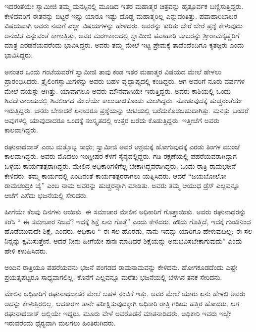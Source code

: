 \vskip 1pt

 ಇದರಂತೆಯೇ ಸ್ವಾಮೀಜಿ ತಮ್ಮ ಮನಸ್ಸಿನಲ್ಲಿ ಮೂಡಿದ ಇತರ ಮಹಾತ್ಮರ ಚಿತ್ರವನ್ನು ಹೃತ್ಪೂರ್ವಕ ಬಣ್ಣಿಸುತ್ತಿದ್ದರು. ಕೇಳಿದವರಿಗೆ ಈತನನ್ನು ಬಿಟ್ಟರೆ ಇನ್ನು ಯಾರೂ ಇಷ್ಟು ದೊಡ್ಡ ಮಹಾತ್ಮರಿಲ್ಲ ಎನ್ನುವಂತಿತ್ತು. ಪವಾಹಾರಿಬಾಬರ ವಿಷಯವಾಗಿ ಅವರು ನಮಗೆ ಎಲ್ಲಾ ವಿಷಯಗಳನ್ನು ಹೇಳಿದರು. ಅವರನ್ನು ಕುರಿತು ಬೇರೆ ಬೇರೆ ಪ್ರಶ್ನೆ \break ಕೇಳುವುದು ಅನುಚಿತ ಎನ್ನುವಂತೆ ಕಾಣುತ್ತಿತ್ತು. ಅವರ ಮರಣಕಾಲದಲ್ಲಿ ಸ್ವಾಮೀಜಿ ಪವಾಹಾರಿ ಬಾಬರನ್ನು ಶ‍್ರೀರಾಮಕೃಷ್ಣರಿಗೆ ಮಾತ್ರ ಎರಡನೆಯವರೆಂದು ಭಾವಿಸಿದ್ದರು. ಅವರು ತಮ್ಮ ಮೇಲೆ ಇಟ್ಟ ಪ್ರೇಮಕ್ಕೆ ತಾವೆಂದೆಂದಿಗೂ ಕೃತಜ್ಞರು ಎಂದು ಭಾವಿಸಿದ್ದರು. 

\vskip 1pt

 ಅನಂತರ ಒಂದು ಗಂಟೆಯವರೆಗೆ ಸ್ವಾಮೀಜಿ ತಾವು ಕಂಡ ಇತರ ಮಹಾತ್ಮರ ವಿಷಯದ ಮೇಲೆ ಹೇಳಲು ಪ್ರಾರಂಭಿಸಿದರು. ತ್ರೈಲಿಂಗಸ್ವಾಮಿಗಳನ್ನು ಅವರು ಬಹಳ ವೃದ್ಧಾಪ್ಯದಲ್ಲಿ ಕಂಡಿದ್ದರು. ಆಗ ಅವರಿಗೆ ನೂರು ವರ್ಷಗಳ ಮೇಲೆ ವಯಸ್ಸು ಆಗಿತ್ತು. ಯಾವಾಗಲೂ ಅವರು ಮೌನವಾಗಿಯೇ ಇರುತ್ತಿದ್ದರು. ಅವರು ಕಾಶಿಯಲ್ಲಿ ಒಂದು ಶಿವದೇವಾಲಯದಲ್ಲಿ ಶಿವಲಿಂಗದ ಮೇಲೆಯೇ ಕಾಲುಚಾಚಿಕೊಂಡು ಮಲಗಿದ್ದರು. ನೋಡುವುದಕ್ಕೆ ಹುಚ್ಚರಂತೆಯೇ ಇರುತ್ತಿದ್ದರು. ಜನರು ಬೇಕಾದರೆ ಏನಾದರೂ ಪ್ರಶ್ನೆಯನ್ನು ಚೀಟಿಯಲ್ಲಿ ಬರೆದುಕೊಡಬಹುದಾಗಿತ್ತು. ಮನಸ್ಸು ಬಂದರೆ ಅವುಗಳಲ್ಲಿ ಯಾವುದಾದರೂ ಒಂದಕ್ಕೆ ಸಂಸ್ಕೃತದಲ್ಲಿ ಉತ್ತರ ಬರೆದು ಕೊಡುತ್ತಿದ್ದರು. ಇತ್ತೀಚೆಗೆ ಅವರು ಕಾಲವಾಗಿದ್ದರು. 

 ರಘುನಾಥದಾಸ್ ಎಂಬ ಮತ್ತೊಬ್ಬ ಸಾಧು; ಸ್ವಾಮೀಜಿ ಅವರ ಆಶ್ರಮಕ್ಕೆ ಹೋಗುವುದಕ್ಕೆ ಎರಡು ತಿಂಗಳ ಮುಂಚೆ ಕಾಲವಾಗಿದ್ದರು. ಅವರು ಮೊದಲು ಇಂಗ್ಲೀಷರ ಕೆಳಗೆ ಸೈನ್ಯದಲ್ಲಿದ್ದರು. ಗಡಿ ರಕ್ಷಣೆಯಲ್ಲಿ ಪಹರೆಯವರಾಗಿದ್ದಾಗ ಒಳ್ಳೆಯ ಕಾರ್ಯತತ್ಪರಾಗಿದ್ದರು. ಮೇಲಿನ ಅಧಿಕಾರಿಗಳಿಗೆಲ್ಲ ಬೇಕಾಗಿದ್ದವರಾಗಿದ್ದರು. ಒಂದು ರಾತ್ರಿ ರಾಮಭಜನೆ ಕೇಳಿದರು. ತಮ್ಮ ಕಾರ್ಯದಲ್ಲಿ ಎಂದಿನಂತೆ ಕಾರ್ಯತತ್ಪರರಾಗಲು ಯತ್ನಿಸಿದರು. ಆದರೆ “ಜಯಬೋಲೋ ರಾಮಚಂದ್ರಕಿ ಜೈ” ಎಂಬ ನಾಮ ಅವರನ್ನು ಹುಚ್ಚರನ್ನಾಗಿ ಮಾಡಿತು. ಅವರು ತಮ್ಮ ಆಯುಧ ಡ್ರೆಸ್ ಎಲ್ಲವನ್ನೂ ಆಚೆಗೆ ಎಸೆದು ಭಜನೆಯಲ್ಲಿ ಸೇರಿದರು. 

 ಹೀಗೆಯೇ ಕೆಲವು ದಿನಗಳು ಆಯಿತು. ಈ ಸಮಾಚಾರ ಮೇಲಿನ ಅಧಿಕಾರಿಗೆ ಗೊತ್ತಾಯಿತು. ಅವರು ರಘುನಾಥರನ್ನು ಕರೆಸಿ “ ಈ ಸಮಾಚಾರ ನಿಜವೆ? ಇದಕ್ಕೆ ಶಿಕ್ಷೆ ಏನು ಗೊತ್ತೆ” ಎಂದು ಕೇಳಿದರು. ಹೌದು ಗೊತ್ತಿದೆ, ಇದಕ್ಕೆ ಗುಂಡಿನಿಂದ ಹೊಡೆಯುವುದೇ ಶಿಕ್ಷೆ, ಎಂದರು. ಅಧಿಕಾರಿ “ ಈ ಸಲ ಹೊರಡು, ನಾನು ಇದನ್ನು ಯಾರಿಗೂ ಹೇಳುವುದಿಲ್ಲ; ಈ ಸಲ ನಿನ್ನನ್ನು ಕ್ಷಮಿಸುತ್ತೇನೆ. ಆದರೆ ನೀನು ಹೀಗೆಯೇ ಪುನಃ ಮಾಡಿದರೆ ಶಿಕ್ಷೆಯನ್ನು ಅನುಭವಿಸಬೇಕಾಗುವುದು” ಎಂದು ಹೇಳಿ ಕಳುಹಿಸಿದರು. 

 ಅಂದಿನ ರಾತ್ರಿಯೂ ಪಹರೆಯವನು ಭಜನೆ ಪಂಗಡದ ರಾಮನಾಮವನ್ನು ಕೇಳಿದನು. ಹೋಗಕೂಡದೆಂದು ಎಷ್ಟೇ ಪ್ರಯತ್ನಪಟ್ಟರೂ ಸಾಧ್ಯವಾಗಲಿಲ್ಲ. ಕೊನೆಗೆ ಎಲ್ಲವನ್ನೂ ಮರೆತು ಭಜನೆಯಲ್ಲಿ ಬೆಳಗಿನ ತನಕ ಸೇರಿದನು. 

 ಮೇಲಿನ ಅಧಿಕಾರಿಗೆ ರಘುನಾಥದಾಸರ ಮೇಲೆ ಬಹಳ ನಂಬಿಕೆ ಇತ್ತು. ಅವರ ಮೇಲೆ ಯಾರು ಏನು ಹೇಳಲಿ ಅವರು ಅದನ್ನು ಕೇಳುತ್ತಿರಲಿಲ್ಲ. ಆದಕಾರಣ ತಾನೇ ಪರೀಕ್ಷಿಸುವುದಕ್ಕಾಗಿ ಅಧಿಕಾರಿ ರಾತ್ರಿ ಗಡಿಯ ಹತ್ತಿರ ಹೋದರು. ಆಗ ರಘುನಾಥದಾಸ್ ಅಲ್ಲಿಯೇ ಇದ್ದರು. ಮೂರು ವೇಳೆ ಅವರೊಡನೆ ಮಾತನಾಡಿದರು. ಅಧಿಕಾರಿ ಇವರು ಇಲ್ಲೇ ಇರುವರೆಂದು ಧೈರ‍್ಯವಾಗಿ ಮಲಗಲು ಹಿಂತಿರುಗಿದರು. 

